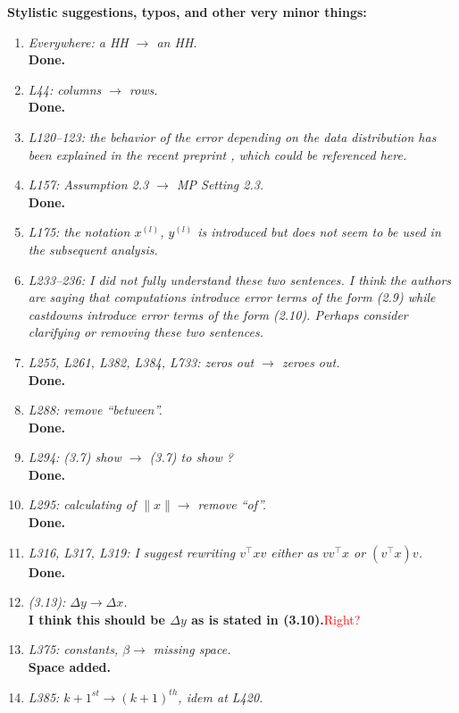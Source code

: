 \documentclass[final,onefignum,onetabnum]{siamart190516}
\newcommand{\red}[1]{\textcolor{red}{#1}}
\begin{document}
\textbf{Stylistic suggestions, typos, and other very minor things:}
\begin{enumerate}
    \item {\it Everywhere: a HH $\rightarrow$ an HH.}\\
    {\bf Done.}
    \item {\it L44: columns $\rightarrow$ rows.}\\
    {\bf Done.}
    \item {\it L120–123: the behavior of the error depending on the data distribution has been explained in the recent preprint \cite{HighamMary2020}, which could be referenced here.}
    \item {\it L157: Assumption 2.3 $\rightarrow$ MP Setting 2.3.}\\
    {\bf Done.}
    \item {\it L175: the notation $x^{(l)}$, $y^{(l)}$ is introduced but does not seem to be used in the
subsequent analysis.}
    \item {\it L233–236: I did not fully understand these two sentences. I think the authors are saying that computations introduce error terms of the form (2.9) while castdowns introduce error terms of the form (2.10). Perhaps consider clarifying or removing these two sentences.}
    \item {\it L255, L261, L382, L384, L733: zeros out $\rightarrow$ zeroes out.}\\
    {\bf Done.}
    \item {\it L288: remove “between”.}\\
    {\bf Done.}
    \item {\it L294: (3.7) show $\rightarrow$ (3.7) to show ?}\\
    {\bf Done.}
    \item {\it L295: calculating of $\|x\|\rightarrow$ remove ``of''.}\\
    {\bf Done.}
    \item {\it L316, L317, L319: I suggest rewriting $v^{\top}xv$ either as $vv^{\top} x$ or $(v^{\top} x)v$.}\\
    {\bf Done.}
    \item {\it (3.13): $\Delta y \rightarrow \Delta x$.}\\
    {\bf I think this should be $\Delta y$ as is stated in (3.10).}\red{Right?} 
    \item {\it L375: constants, $\beta \rightarrow$ missing space.}\\
    {\bf Space added.}
    \item {\it L385: $k+1^{st} \rightarrow (k+1)^{th}$, idem at L420.}\\

\end{enumerate}
\end{document}
